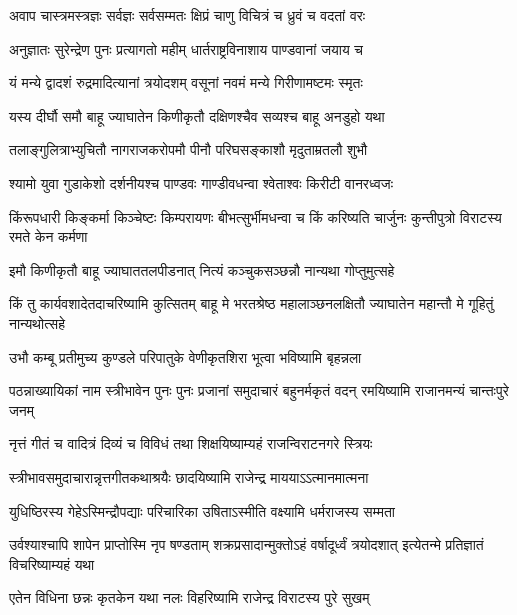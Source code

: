 \twolineshloka
{अवाप चास्त्रमस्त्रज्ञः सर्वज्ञः सर्वसम्मतः}
{क्षिप्रं चाणु विचित्रं च ध्रुवं च वदतां वरः}


\twolineshloka
{अनुज्ञातः सुरेन्द्रेण पुनः प्रत्यागतो महीम्}
{धार्तराष्ट्रविनाशाय पाण्डवानां जयाय च}


\twolineshloka
{यं मन्ये द्वादशं रुद्रमादित्यानां त्रयोदशम्}
{वसूनां नवमं मन्ये गिरीणामष्टमः स्मृतः}


\twolineshloka
{यस्य दीर्घौ समौ बाहू ज्याघातेन किणीकृतौ}
{दक्षिणश्चैव सव्यश्च बाहू अनडुहो यथा}



\twolineshloka
{तलाङ्गुलित्राभ्युचितौ नागराजकरोपमौ}
{पीनौ परिघसङ्काशौ मृदुताम्रतलौ शुभौ}


\twolineshloka
{श्यामो युवा गुडाकेशो दर्शनीयश्च पाण्डवः}
{गाण्डीवधन्वा श्वेताश्वः किरीटी वानरध्वजः}


\threelineshloka
{किंरूपधारी किङ्कर्मा किञ्चेष्टः किम्परायणः}
{बीभत्सुर्भीमधन्वा च किं करिष्यति चार्जुनः}
{कुन्तीपुत्रो विराटस्य रमते केन कर्मणा}




\twolineshloka
{इमौ किणीकृतौ बाहू ज्याघाततलपीडनात्}
{नित्यं कञ्चुकसञ्छन्नौ नान्यथा गोप्तुमुत्सहे}


\onelineshloka
{किं तु कार्यवशादेतदाचरिष्यामि कुत्सितम्}
\twolineshloka
{बाहू मे भरतश्रेष्ठ महालाञ्छनलक्षितौ}
{ज्याघातेन महान्तौ मे गूहितुं नान्यथोत्सहे}


\twolineshloka
{उभौ कम्बू प्रतीमुच्य कुण्डले परिपातुके}
{वेणीकृतशिरा भूत्वा भविष्यामि बृहन्नला}


\threelineshloka
{पठन्नाख्यायिकां नाम स्त्रीभावेन पुनः पुनः}
{प्रजानां समुदाचारं बहुनर्मकृतं वदन्}
{रमयिष्यामि राजानमन्यं चान्तःपुरे जनम्}


\twolineshloka
{नृत्तं गीतं च वादित्रं दिव्यं च विविधं तथा}
{शिक्षयिष्याम्यहं राजन्विराटनगरे स्त्रियः}


\twolineshloka
{स्त्रीभावसमुदाचारान्नृत्तगीतकथाश्रयैः}
{छादयिष्यामि राजेन्द्र माययाऽऽत्मानमात्मना}


\twolineshloka
{युधिष्ठिरस्य गेहेऽस्मिन्द्रौपद्याः परिचारिका}
{उषिताऽस्मीति वक्ष्यामि धर्मराजस्य सम्मता}


\threelineshloka
{उर्वश्याश्चापि शापेन प्राप्तोस्मि नृप षण्डताम्}
{शक्रप्रसादान्मुक्तोऽहं वर्षादूर्ध्वं त्रयोदशात्}
{इत्येतन्मे प्रतिज्ञातं विचरिष्याम्यहं यथा}


\twolineshloka
{एतेन विधिना छन्नः कृतकेन यथा नलः}
{विहरिष्यामि राजेन्द्र विराटस्य पुरे सुखम्}

